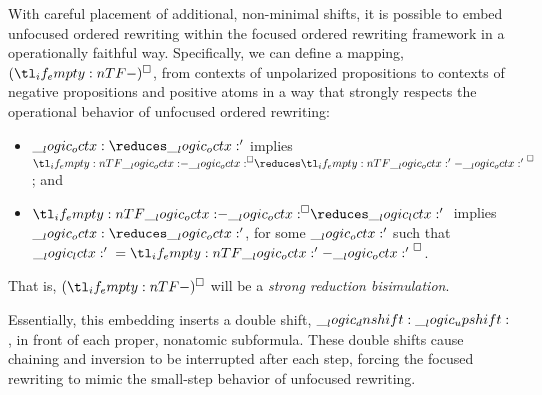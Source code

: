 With careful placement of additional, non-minimal shifts, it is possible to embed unfocused ordered rewriting within the focused ordered rewriting framework in a operationally faithful way.
Specifically, we can define a mapping, $\embed*{}$, from contexts of unpolarized propositions to contexts of negative propositions and positive atoms in a way that strongly respects the operational behavior of unfocused ordered rewriting:
\begin{itemize}[noitemsep]
\item $\octx \reduces \octx'$ implies $\embed{\octx} \reduces \embed{\octx'{}}$; and
\item $\embed{\octx} \reduces \np{\lctx'{}}$ implies $\octx \reduces \octx'$, for some $\__logic_octx:'$ such that $\np{\lctx'{}} = \embed{\octx'{}}$.
\end{itemize}
That is, $\embed*{}$ will be a \emph{strong reduction bisimulation}\autocite{Sangiorgi+Walker:CUP03}.

Essentially, this embedding inserts a double shift, $\__logic_dnshift: \__logic_upshift:$, in front of each proper, nonatomic subformula.
These double shifts cause chaining and inversion to be interrupted after each step, forcing the focused rewriting to mimic the small-step behavior of unfocused rewriting.


